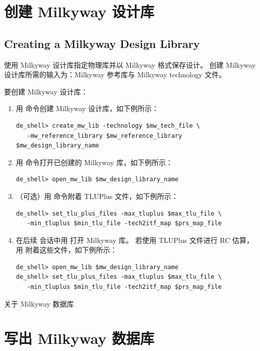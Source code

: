 \section{创建 Milkyway 设计库}
\subsection*{Creating a Milkyway Design Library}

使用 Milkyway 设计库指定物理库并以 Milkyway 格式保存设计。
创建 Milkyway 设计库所需的输入为：Milkyway 参考库与 Milkyway technology 文件。

要创建 Milkyway 设计库：
\begin{enumerate}
  \item 用  命令创建 Milkyway 设计库，如下例所示：
\begin{lstlisting}
de_shell> create_mw_lib -technology $mw_tech_file \
   -mw_reference_library $mw_reference_library $mw_design_library_name
\end{lstlisting}
  \item 用  命令打开已创建的 Milkyway 库，如下例所示：
\begin{lstlisting}
de_shell> open_mw_lib $mw_design_library_name
\end{lstlisting}
  \item （可选）用  命令附着 TLUPlus 文件，如下例所示：
\begin{lstlisting}
de_shell> set_tlu_plus_files -max_tluplus $max_tlu_file \
   -min_tluplus $min_tlu_file -tech2itf_map $prs_map_file
\end{lstlisting}
  \item 在后续 \cmd{de\_shell} 会话中用 \cmd{open\_mw\_lib} 打开 Milkyway 库。
        若使用 TLUPlus 文件进行 RC 估算，用  附着这些文件，如下例所示：
\begin{lstlisting}
de_shell> open_mw_lib $mw_design_library_name
de_shell> set_tlu_plus_files -max_tluplus $max_tlu_file \
   -min_tluplus $min_tlu_file -tech2itf_map $prs_map_file
\end{lstlisting}
\end{enumerate}

\begin{seeAlsoBox}
关于 Milkyway 数据库
\end{seeAlsoBox}

\section{写出 Milkyway 数据库}
